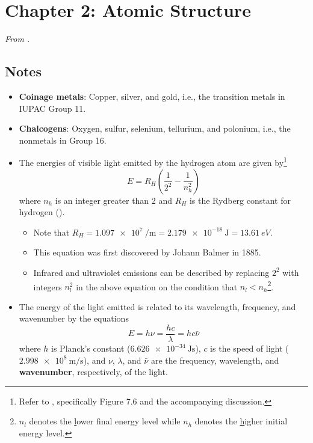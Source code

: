 \documentclass[../main.tex]{subfiles}
\begin{document}
\newpage



\section{Chapter 2: Atomic Structure}
\emph{From \textcite{bib:MiesslerFischerTarr}.}
\subsection{Notes}
\begin{itemize}
    \item {}\textbf{Coinage metals}: Copper, silver, and gold, i.e., the transition metals in IUPAC Group 11.
    \item \textbf{Chalcogens}: Oxygen, sulfur, selenium, tellurium, and polonium, i.e., the nonmetals in Group 16.
    \item The energies of visible light emitted by the hydrogen atom are given by\footnote{Refer to \textcite{bib:APChemNotes}, specifically Figure 7.6 and the accompanying discussion.}
    \begin{equation*}
        E = R_H\left( \frac{1}{2^2}-\frac{1}{n_h^2} \right)
    \end{equation*}
    where $n_h$ is an integer greater than 2 and $R_H$ is the Rydberg constant for hydrogen ().
    \begin{itemize}
        \item Note that $
            R_H = \SI{1.097e7}{\per\meter}
            = \SI{2.179e-18}{\joule}
            = \SI{13.61}{eV}
        $.
        \item This equation was first discovered by Johann Balmer in 1885.
        \item Infrared and ultraviolet emissions can be described by replacing $2^2$ with integers $n_l^2$ in the above equation on the condition that $n_l<n_h$\footnote{$n_l$ denotes the \underline{l}ower final energy level while $n_h$ denotes the \underline{h}igher initial energy level.}.
    \end{itemize}
    \item The energy of the light emitted is related to its wavelength, frequency, and wavenumber by the equations
    \begin{equation*}
        E = h\nu = \frac{hc}{\lambda} = hc\bar{\nu}
    \end{equation*}
    where $h$ is Planck's constant ($\SI{6.626e-34}{\joule\second}$), $c$ is the speed of light ($\SI{2.998e8}{\meter\per\second}$), and $\nu$, $\lambda$, and $\bar{\nu}$ are the frequency, wavelength, and \textbf{wavenumber}, respectively, of the light.

\end{itemize}
\end{document}
